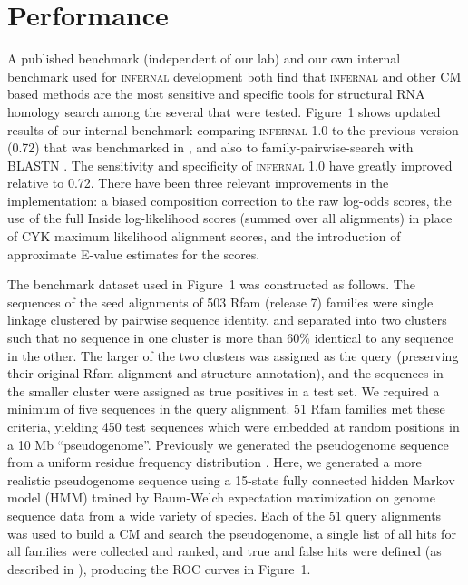 
\section{Performance}


A published benchmark (independent of our lab) \citep{Freyhult07} and
our own internal benchmark used for \textsc{infernal} development
\citep{NawrockiEddy07} both find that \textsc{infernal} and other CM
based methods are the most sensitive and specific tools for structural
RNA homology search among the several that were tested. Figure~1 shows
updated results of our internal benchmark comparing \textsc{infernal}
1.0 to the previous version (0.72) that was benchmarked in
\citet{Freyhult07}, and also to family-pairwise-search with BLASTN
\citep{Altschul97,Grundy98b}.  The sensitivity and specificity of
\textsc{infernal} 1.0 have greatly improved relative to 0.72. There
have been three relevant improvements in the implementation: a biased
composition correction to the raw log-odds scores, the use of the full
Inside log-likelihood scores (summed over all alignments) in place of
CYK maximum likelihood alignment scores, and the introduction of
approximate E-value estimates for the scores.

The benchmark dataset used in Figure~1 
was constructed as follows. The sequences of the seed
alignments of 503 Rfam (release 7) families were single linkage
clustered by pairwise sequence identity, and separated into two
clusters such that no sequence in one cluster is more than 60\%
identical to any sequence in the other. The larger of the two clusters
was assigned as the query (preserving their original Rfam alignment
and structure annotation), and the sequences in the smaller cluster
were assigned as true positives in a test set. We required a minimum
of five sequences in the query alignment. 51 Rfam families met these
criteria, yielding 450 test sequences which were embedded at random
positions in a 10 Mb ``pseudogenome''.  Previously we generated the
pseudogenome sequence from a uniform residue frequency distribution \citep{NawrockiEddy07}.
Here, we generated a more realistic pseudogenome sequence using a
15-state fully connected hidden Markov model (HMM) trained by
Baum-Welch expectation maximization \citep{Durbin98} on genome
sequence data from a wide variety of species.  Each of the 51 query
alignments was used to build a CM and search the pseudogenome, a
single list of all hits for all families were collected and ranked,
and true and false hits were defined (as described in
\citet{NawrockiEddy07}), producing the ROC curves in Figure~1.

